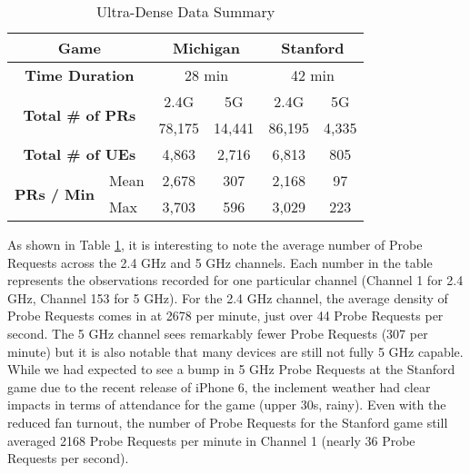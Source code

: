 \documentclass[conference]{IEEEtran}
\begin{document}
\begin{table}
\centering
\caption{Ultra-Dense Data Summary}
\label{data_summary}

\begin{tabular}{|p{1.8cm}|p{0.001cm}|c|c|c|c|}
\hline

        \multicolumn{2}{|c|}{\textbf{Game}}                                              & \multicolumn{2}{c|}{Michigan}                                                   & \multicolumn{2}{c|}{Stanford}                                                   \\ \hline

      \multicolumn{2}{|c|}{\textbf{Time Duration}}                                  & \multicolumn{2}{c|}{28 min } &  \multicolumn{2}{c|}{42 min}                                                           \\ \hline

\multicolumn{2}{|c|}{\multirow{2}{*}{\textbf{Total \# of PRs}}} & 2.4G & 5G & 2.4G & 5G \\\cline{3-6} 

\multicolumn{2}{|c|}{}&78,175   & 14,441       & 86,195           & 4,335     \\ \hline

  \multicolumn{2}{|c|}{\textbf{Total \# of UEs} }    & 4,863& 2,716 & 6,813 &805\\\hline

\multirow{2}{*}{\textbf{PRs / Min}}                  & \multicolumn{1}{p{0.7cm}|}{Mean}                &    2,678           & 307                  & 2,168      & 97            \\ \cline{2-6} 

                                                     & \multicolumn{1}{p{0.7cm}|}{ Max}                &   3,703             & 596                & 3,029         & 223               \\ \hline
\end{tabular}
\end{table}

As shown in Table \ref{data_summary}, it is interesting to note the average number of Probe Requests across the 2.4 GHz and 5 GHz channels. Each number in the table represents the observations recorded for one particular channel (Channel 1 for 2.4 GHz, Channel 153 for 5 GHz). For the 2.4 GHz channel, the average density of Probe Requests comes in at 2678 per minute, just over 44 Probe Requests per second. The 5 GHz channel sees remarkably fewer Probe Requests (307 per minute) but it is also notable that many devices are still not fully 5 GHz capable. While we had expected to see a bump in 5 GHz Probe Requests at the Stanford game due to the recent release of iPhone 6, the inclement weather had clear impacts in terms of attendance for the game (upper 30s, rainy). Even with the reduced fan turnout, the number of Probe Requests for the Stanford game still averaged 2168 Probe Requests per minute in Channel 1 (nearly 36 Probe Requests per second).    
\end{document}
